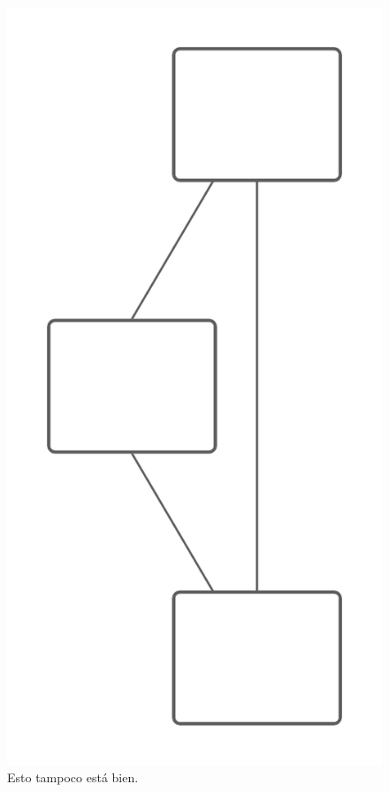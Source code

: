 \documentclass[a4paper,11pt]{article}
\begin{document}
\begin{figure}[!h]
    \centering
    \includegraphics[scale=.7]{assets/ec2.png}
    \caption{Esto tampoco está bien.}
\end{figure}
\end{document}
